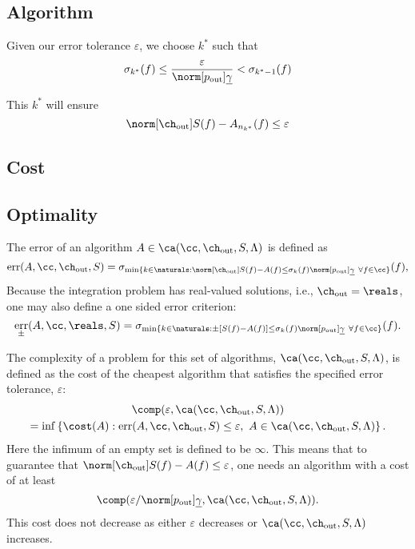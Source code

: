 \documentclass[final]{elsarticle}
\newcommand{\chout}{\ch_{\text{\rm{out}}}}
\newcommand{\pout}{p_{\text{\rm{out}}}}
\DeclareMathOperator{\err}{err}
\theoremstyle{definition}
\theoremstyle{remark}
\begin{document}
\subsection{Algorithm}

Given our error tolerance $\varepsilon$, we choose $k^*$ such that
\begin{equation}
\sigma_{k^*}(f) \le \frac{\varepsilon}{\norm[\pout]{\underline{\gamma}}} < \sigma_{k^*-1}(f)
\end{equation}

This $k^*$ will ensure
\begin{equation}
\norm[\chout]{S(f)-A_{n_{k^*}}(f)} \le \varepsilon
\end{equation}

\subsection{Cost}

\subsection{Optimality}

The error of an algorithm $A  \in \ca(\cc,\chout,S,\Lambda)$ is defined  as
\begin{equation} \label{errdefworst}
\err(A,\cc,\chout,S)
= \sigma_{\min \{ k \in \naturals: \norm[\chout]{S(f) -  A(f)} \le \sigma_{k}(f) \norm[\pout]{\underline{\gamma}} \ \forall f \in \cc \}}(f),
\end{equation}
Because the integration problem has real-valued solutions, i.e., $\chout=\reals$, one may also define a one sided error criterion:
\begin{equation}\label{errpmdefworst}
\err_{\pm}(A,\cc,\reals,S) =
\sigma_{\min \{ k \in \naturals: \pm [{S(f) -  A(f)}] \le \sigma_{k}(f) \norm[\pout]{\underline{\gamma}} \ \forall f \in \cc \}}(f).
\end{equation}

The complexity of a problem for this set of algorithms, $\ca(\cc,\chout,S,\Lambda)$, is defined as the cost of the cheapest algorithm that satisfies the specified error tolerance, $\varepsilon$:
\begin{multline} \label{fixcostcomplex}
\comp(\varepsilon,\ca(\cc,\chout,S,\Lambda)) \\
= \inf\left\{\cost(A) : \err(A,\cc,\chout,S) \le \varepsilon, \ A  \in \ca(\cc,\chout,S,\Lambda) \right \}.
\end{multline}
Here the infimum of an empty set is defined to be $\infty$.  This means that to guarantee that $\norm[\chout]{S(f) -  A(f)} \le \varepsilon$, one needs an algorithm with a cost of at least
\[
\comp(\varepsilon/\norm[\pout]{\underline{\gamma}},\ca(\cc,\chout,S,\Lambda)).
\]
This cost does not decrease as either $\varepsilon$ decreases or $\ca(\cc,\chout,S,\Lambda)$ increases.
\end{document}
